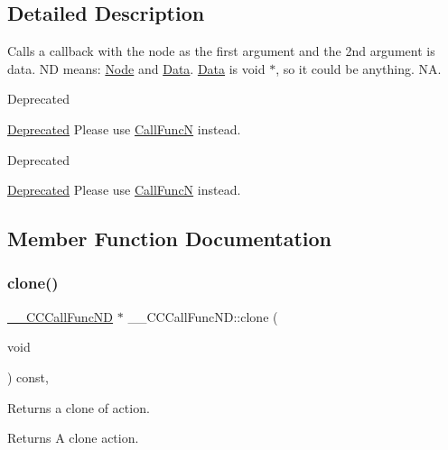 \subsection{Detailed Description}
Calls a \textquotesingle{}callback\textquotesingle{} with the node as the first argument and the 2nd argument is data. ND means\+: \hyperlink{classNode}{Node} and \hyperlink{classData}{Data}. \hyperlink{classData}{Data} is void $\ast$, so it could be anything.  NA. 

\begin{DoxyRefDesc}{Deprecated}
\item[\hyperlink{deprecated__deprecated000011}{Deprecated}]Please use \hyperlink{classCallFuncN}{Call\+FuncN} instead. \end{DoxyRefDesc}


\begin{DoxyRefDesc}{Deprecated}
\item[\hyperlink{deprecated__deprecated000241}{Deprecated}]Please use \hyperlink{classCallFuncN}{Call\+FuncN} instead. \end{DoxyRefDesc}


\subsection{Member Function Documentation}
\mbox{\label{class____CCCallFuncND_a0b1d35734a49b6c12144e4b025fe84eb}} 
\subsubsection{\texorpdfstring{clone()}{clone()}\hspace{0.1cm}{\footnotesize\ttfamily [1/2]}}
{\footnotesize\ttfamily \hyperlink{class____CCCallFuncND}{\+\_\+\+\_\+\+C\+C\+Call\+Func\+ND} $\ast$ \+\_\+\+\_\+\+C\+C\+Call\+Func\+N\+D\+::clone (\begin{DoxyParamCaption}\item[{void}]{ }\end{DoxyParamCaption}) const\hspace{0.3cm}{\ttfamily [override]}, {\ttfamily [virtual]}}

Returns a clone of action.

\begin{DoxyReturn}{Returns}
A clone action. 
\end{DoxyReturn}


